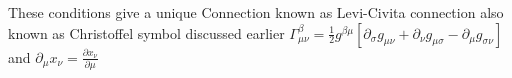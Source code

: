\documentclass{article}
\begin{document}
These conditions give a unique Connection known as Levi-Civita connection also known as Christoffel symbol discussed earlier 
$\varGamma^\beta_{\mu\nu} = \frac{1}{2}g^{\beta\mu} [\partial_\sigma g_{\mu\nu}+\partial_\nu g_{\mu\sigma}-\partial_\mu g_{\sigma\nu} ]$ and $\partial_\mu x_\nu = \frac{\partial x_\nu}{\partial \mu}$
\end{document}

